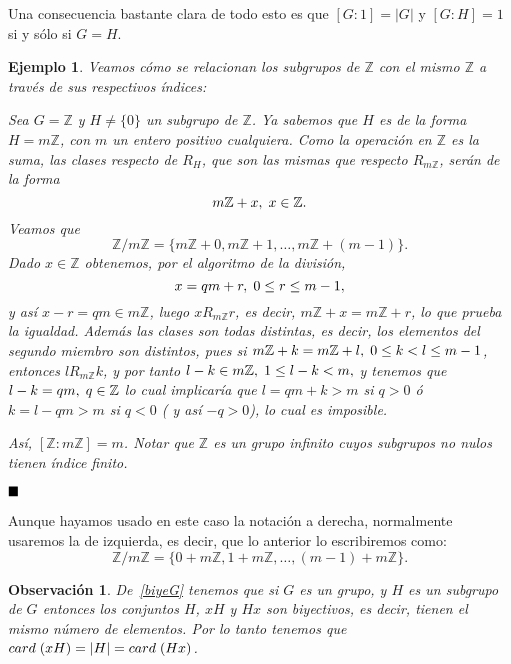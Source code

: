 \documentclass[12pt]{article}
\newtheorem{example}{Ejemplo}[theorem]
\newtheorem{observation}{Observación}[theorem]
\begin{document}
Una consecuencia bastante clara de todo esto es que $[G:1] = |G|$ y $[G:H] = 1$ si y sólo si $G = H$.

\begin{example} Veamos cómo se relacionan los subgrupos de $\mathbb{Z}$ con el mismo $\mathbb{Z}$ a través de sus respectivos índices:

Sea $G = \mathbb{Z}$ y $H \neq \lbrace 0 \rbrace$ un subgrupo de $\mathbb{Z}$. Ya sabemos que $H$ es de la forma $H = m\mathbb{Z}$, con $m$ un entero positivo cualquiera. Como la operación en $\mathbb{Z}$ es la \textit{suma}, las clases respecto de $R_{H}$, que son las mismas que respecto $R_{m\mathbb{Z}}$, serán de la forma $$m\mathbb{Z} + x, \hspace{0.1cm} x \in \mathbb{Z}.$$ Veamos que $$\mathbb{Z}/m\mathbb{Z} = \lbrace m\mathbb{Z} + 0, m\mathbb{Z} + 1, \ldots, m\mathbb{Z} + (m-1)\rbrace.$$ Dado $x \in \mathbb{Z}$ obtenemos, por el algoritmo de la división, $$x = qm + r, \hspace{0.1cm} 0\leq r\leq m-1,$$y así $x-r = qm \in m\mathbb{Z}$, luego $xR_{m\mathbb{Z}}r$, es decir, $m\mathbb{Z} + x = m\mathbb{Z} + r$, lo que prueba la igualdad. Además las clases son todas distintas, es decir, los elementos del segundo miembro son distintos, pues si $m\mathbb{Z} + k = m\mathbb{Z} + l, \hspace{0.1cm} 0\leq k < l \leq m-1$, entonces $lR_{m\mathbb{Z}}k$, y por tanto $l-k \in m\mathbb{Z}, \hspace{0.1cm} 1\leq l-k <m,$ y tenemos que $l-k = qm, \hspace{0.1cm} q \in \mathbb{Z}$ lo cual implicaría que $l = qm +k > m$ si $q>0$ ó $k = l - qm >m$ si $q < 0$ ( y así $-q >0$), lo cual es imposible.

Así, $\left[ \mathbb{Z}:m\mathbb{Z} \right] = m$. Notar que $\mathbb{Z}$ es un grupo infinito cuyos subgrupos no nulos tienen índice finito.
\end{example}
$\hfill \blacksquare$

Aunque hayamos usado en este caso la notación a derecha, normalmente usaremos la de izquierda, es decir, que lo anterior lo escribiremos como: $$\mathbb{Z}/m\mathbb{Z} = \lbrace 0 + m\mathbb{Z}, 1 + m\mathbb{Z}, \ldots, (m-1) + m\mathbb{Z} \rbrace.$$

\begin{observation} De~\ref{biyeG} tenemos que si $G$ es un grupo, y $H$ es un subgrupo de $G$ entonces los conjuntos $H$, $xH$ y $Hx$ son biyectivos, es decir, tienen el mismo número de elementos. Por lo tanto tenemos que $card \hspace{0.1cm} (xH) = |H| = card \hspace{0.1cm} (Hx)$.
\end{observation}
\end{document}
